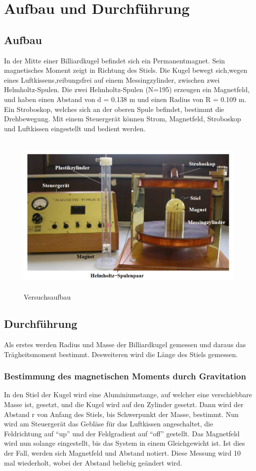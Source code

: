 \section{Aufbau und Durchführung}
\label{sec:Durchführung}
\subsection{Aufbau}

In der Mitte einer Billiardkugel befindet sich ein Permanentmagnet. Sein magnetisches Moment zeigt in Richtung des Stiels. Die Kugel bewegt sich,wegen eines Luftkissens,reibungsfrei auf einem Messingzylinder, zwischen zwei Helmholtz-Spulen.  Die zwei Helmholtz-Spulen (N=195) erzeugen ein Magnetfeld, und haben einen Abstand von d = 0.138 m und einen Radius von R = 0.109 m.
Ein Stroboskop, welches sich an der oberen Spule befindet, bestimmt die Drehbewegung.
Mit einem Steuergerät können Strom, Magnetfeld, Stroboskop und Luftkissen eingestellt und bedient werden.

\begin{figure}[H]
  \centering
  \includegraphics[height=8cm]{Screenshot (3).png}
  \caption{Versuchsaufbau}
  \label{fig:drill}
\end{figure}


\subsection{Durchführung}
Als erstes werden Radius und Masse der Billiardkugel gemessen und daraus das Trägheitsmoment bestimmt. Desweiteren wird die Länge des Stiels gemessen.

\subsubsection{Bestimmung des magnetischen Moments durch Gravitation}
In den Stiel der Kugel wird eine Aluminiumstange, auf welcher eine verschiebbare Masse ist, gesetzt, und die Kugel wird auf den Zylinder gesetzt.
Dann wird der Abstand r von Anfang des Stiels, bis Schwerpunkt der Masse, bestimmt. 
Nun wird am Steuergerät das Gebläse für das Luftkissen angeschaltet, die Feldrichtung auf ``up'' und der Feldgradient auf ``off'' gestellt.
Das Magnetfeld wird nun solange eingestellt, bis das System in einem Gleichgewicht ist. 
Ist dies der Fall, werden sich Magnetfeld und Abstand notiert.
Diese Messung wird 10 mal wiederholt, wobei der Abstand beliebig geändert wird.

